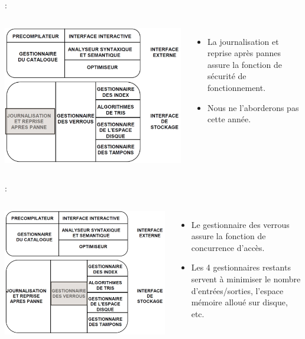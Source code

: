 \documentclass[10pt]{beamer}
\begin{document}
\begin{frame}{\secname : \subsecname}
    \begin{columns}
        \includegraphics[width=0.8\linewidth]{../assets/img/architecture_sgbd--4.jpg}
        \begin{itemize}
            \item La journalisation et reprise après pannes assure la fonction de sécurité de fonctionnement.
            \item Nous ne l’aborderons pas cette année.
        \end{itemize}
    \end{columns}
\end{frame}

\begin{frame}{\secname : \subsecname}
    \begin{columns}
        \includegraphics[width=0.8\linewidth]{../assets/img/architecture_sgbd--5.jpg}
        \begin{itemize}
            \item Le gestionnaire des verrous assure la fonction de concurrence d’accès.
            \item Les 4 gestionnaires restants servent à minimiser le nombre d’entrées/sorties, l’espace mémoire alloué sur disque, etc.
        \end{itemize}
    \end{columns}
\end{frame}
\end{document}
